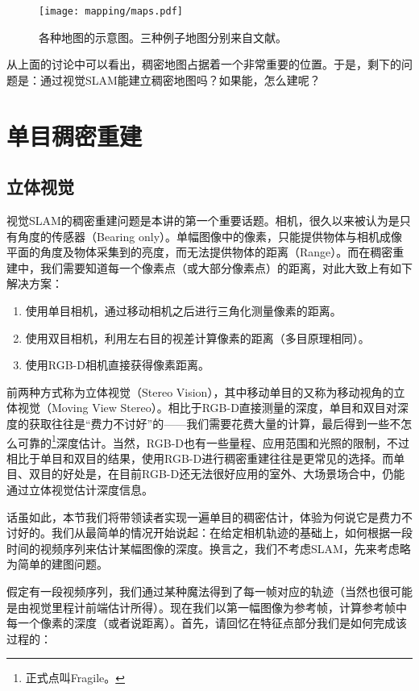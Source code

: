 \begin{figure}[!ht]
	\centering
	\texttt{[image: mapping/maps.pdf]}
	\caption{各种地图的示意图。三种例子地图分别来自文献\cite{Mur-Artal2015, Labbe2014, Salas-Moreno2013}。}
	\label{fig:maps}
\end{figure}

从上面的讨论中可以看出，稠密地图占据着一个非常重要的位置。于是，剩下的问题是：通过视觉SLAM能建立稠密地图吗？如果能，怎么建呢？

\section{单目稠密重建}
\subsection{立体视觉}
视觉SLAM的稠密重建问题是本讲的第一个重要话题。相机，很久以来被认为是只有角度的传感器（Bearing only）。单幅图像中的像素，只能提供物体与相机成像平面的角度及物体采集到的亮度，而无法提供物体的距离（Range）。而在稠密重建中，我们需要知道每一个像素点（或大部分像素点）的距离，对此大致上有如下解决方案：

\begin{enumerate}
	\item 使用单目相机，通过移动相机之后进行三角化测量像素的距离。
	\item 使用双目相机，利用左右目的视差计算像素的距离（多目原理相同）。
	\item 使用RGB-D相机直接获得像素距离。
\end{enumerate}

前两种方式称为立体视觉（Stereo Vision），其中移动单目的又称为移动视角的立体视觉（Moving View Stereo）。相比于RGB-D直接测量的深度，单目和双目对深度的获取往往是“费力不讨好”的——我们需要花费大量的计算，最后得到一些不怎么可靠的\footnote{正式点叫Fragile。}深度估计。当然，RGB-D也有一些量程、应用范围和光照的限制，不过相比于单目和双目的结果，使用RGB-D进行稠密重建往往是更常见的选择。而单目、双目的好处是，在目前RGB-D还无法很好应用的室外、大场景场合中，仍能通过立体视觉估计深度信息。

话虽如此，本节我们将带领读者实现一遍单目的稠密估计，体验为何说它是费力不讨好的。我们从最简单的情况开始说起：在给定相机轨迹的基础上，如何根据一段时间的视频序列来估计某幅图像的深度。换言之，我们不考虑SLAM，先来考虑略为简单的建图问题。

假定有一段视频序列，我们通过某种魔法得到了每一帧对应的轨迹（当然也很可能是由视觉里程计前端估计所得）。现在我们以第一幅图像为参考帧，计算参考帧中每一个像素的深度（或者说距离）。首先，请回忆在特征点部分我们是如何完成该过程的：

